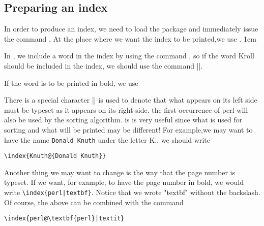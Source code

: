 \pagestyle{headings}


\setlength{\columnsep}{2em}
\begin{multicols}{2}

\section{Preparing an index}

In order to produce an index, we need to load the
package   and immediately issue the command \cmd{\makeindex}.
At the place where
we want the index to be printed,we use \cmd{\printindex}.
\parindent1em

In \latex, we include a word
in the index by using the command \cmd{\index}, so if the word Kroll should be included in
the index, we should use the command ||.

If the word is to be printed in bold, we use






There is a  special character |\@| is used to denote that what appears on its left side must be
typeset as it appears on its right side.  the first occurrence of perl will also be used
by the sorting algorithm. is is very useful since what is used for sorting and what
will be printed may be different! For example,we may want to have the name 
\texttt{Donald Knuth}  under the letter K., we should write


\verb+\index{Knuth@{Donald Knuth}}+

Another thing we may want to change is the way that the page number is typeset.
If we want, for example, to have the page number in bold, we would write
\verb+\index{perl|textbf}+.  Notice that we wrote "textbf"  without the backslash. Of course,
the above can be combined with the  command


\verb+\index{perl@\textbf{perl}|textit}+



\end{multicols}
